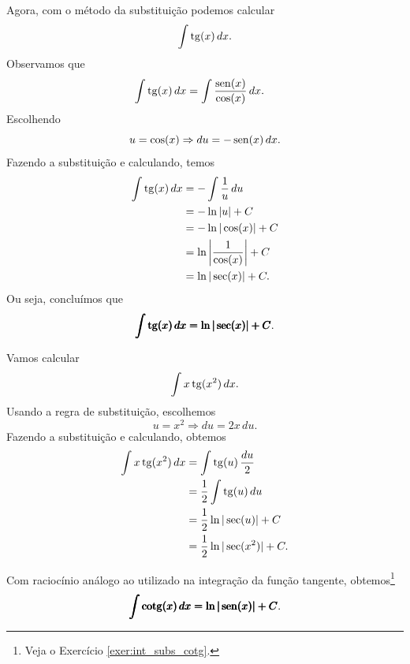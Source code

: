 Agora, com o método da substituição podemos calcular
\begin{equation}
  \int \operatorname{tg}(x)\,dx.
\end{equation}
Observamos que
\begin{align}
  \int \operatorname{tg}(x)\,dx &= \int \frac{\operatorname{sen}(x)}{\cos(x)}\,dx.
\end{align}
Escolhendo
\begin{equation}
  u = \cos(x) \Rightarrow du = -\operatorname{sen}(x)\,dx.
\end{equation}
Fazendo a substituição e calculando, temos
\begin{align}
  \int \operatorname{tg}(x)\,dx &= -\int \frac{1}{u}\,du \\
                  &= -\ln|u| + C \\
                  &= -\ln|\cos(x)| + C \\
                  &= \ln\left|\frac{1}{\cos(x)}\right| + C\\
                  &= \ln|\sec(x)| + C.
\end{align}
Ou seja, concluímos que
\begin{equation}
  \pmb{\int\operatorname{tg}(x)\,dx = \ln|\sec(x)| + C}.
\end{equation}

\begin{ex}
  Vamos calcular
  \begin{equation}
    \int x\operatorname{tg}(x^2)\,dx.
  \end{equation}
  Usando a regra de substituição, escolhemos
  \begin{equation}
    u = x^2 \Rightarrow du = 2x\,du.
  \end{equation}
  Fazendo a substituição e calculando, obtemos
  \begin{align}
    \int x\operatorname{tg}(x^2)\,dx &= \int \operatorname{tg}(u)\,\frac{du}{2} \\
                       &= \frac{1}{2}\int \operatorname{tg}(u)\,du \\
                       &= \frac{1}{2}\ln|\sec(u)| + C \\
                       &= \frac{1}{2}\ln|\sec(x^2)| + C.
  \end{align}
\end{ex}

Com raciocínio análogo ao utilizado na integração da função tangente, obtemos\footnote{Veja o Exercício \ref{exer:int_subs_cotg}.}
\begin{equation}
  \pmb{\int \operatorname{cotg}(x)\,dx = \ln|\operatorname{sen}(x)| + C}.
\end{equation}

